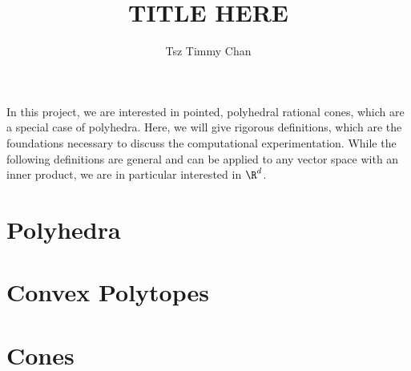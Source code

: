 \documentclass{TC}
\title{TITLE HERE}	%
\author{Tsz Timmy Chan}	%
\begin{document}
In this project, we are interested in pointed, polyhedral rational cones, which are a special case of polyhedra. Here, we will give rigorous definitions, which are the foundations necessary to discuss the computational experimentation. While the following definitions are general and can be applied to any vector space with an inner product, we are in particular interested in $\R^d$.

\section{Polyhedra}


\section{Convex Polytopes}


\section{Cones}

\end{document}
